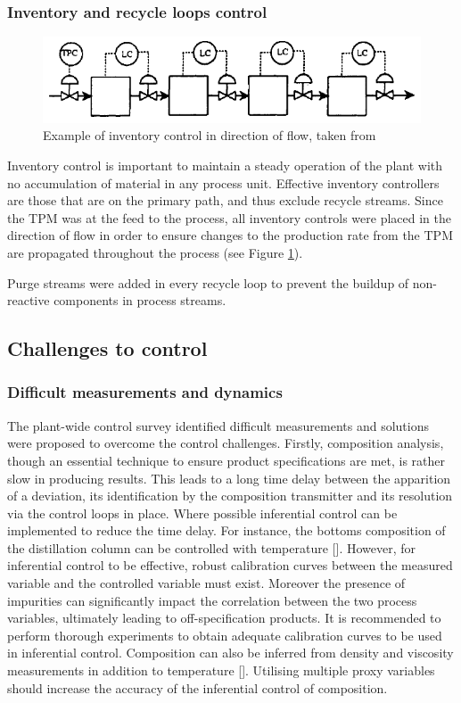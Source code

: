 \subsubsection{Inventory and recycle loops control} %
    \begin{figure}
        \centering
        \includegraphics[width=\linewidth]{chapters/4-operation-control/4-Figures/TPM-Price-1994.png}
        \caption{Example of inventory control in direction of flow, taken from \textcite{}}
        \label{fig:TPM}
    \end{figure}
Inventory control is important to maintain a steady operation of the plant with no accumulation of material in any process unit. Effective inventory controllers are those that are on the primary path, and thus exclude recycle streams. Since the TPM was at the feed to the process, all inventory controls were placed in the direction of flow in order to ensure changes to the production rate from the TPM are propagated throughout the process (see Figure \ref{fig:TPM}). 

Purge streams were added in every recycle loop to prevent the buildup of non-reactive components in process streams.  


\subsection{Challenges to control}%

\subsubsection{Difficult measurements and dynamics} %
The plant-wide control survey identified difficult measurements and solutions were proposed to overcome the control challenges. Firstly, composition analysis, though an essential technique to ensure product specifications are met, is rather slow in producing results. This leads to a long time delay between the apparition of a deviation, its identification by the composition transmitter and its resolution via the control loops in place. Where possible inferential control can be implemented to reduce the time delay. For instance, the bottoms composition of the distillation column can be controlled with temperature []. However, for inferential control to be effective, robust calibration curves between the measured variable and the controlled variable must exist. Moreover the presence of impurities can significantly impact the correlation between the two process variables, ultimately leading to off-specification products. It is recommended to perform thorough experiments to obtain adequate calibration curves to be used in inferential control. Composition can also be inferred from density and viscosity measurements in addition to temperature []. Utilising multiple proxy variables should increase the accuracy of the inferential control of composition.


